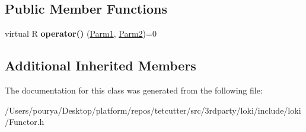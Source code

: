 \subsection*{Public Member Functions}
\begin{DoxyCompactItemize}
\item 
\hypertarget{classLoki_1_1FunctorImpl_3_01R_00_01LOKI__TYPELIST__2_07P1_00_01P2_08_00_01ThreadingModel_01_4_a50dba35866b643235434f16d15d630d5}{}virtual R {\bfseries operator()} (\hyperlink{classLoki_1_1EmptyType}{Parm1}, \hyperlink{classLoki_1_1EmptyType}{Parm2})=0\label{classLoki_1_1FunctorImpl_3_01R_00_01LOKI__TYPELIST__2_07P1_00_01P2_08_00_01ThreadingModel_01_4_a50dba35866b643235434f16d15d630d5}

\end{DoxyCompactItemize}
\subsection*{Additional Inherited Members}


The documentation for this class was generated from the following file\+:\begin{DoxyCompactItemize}
\item 
/\+Users/pourya/\+Desktop/platform/repos/tetcutter/src/3rdparty/loki/include/loki/Functor.\+h\end{DoxyCompactItemize}
